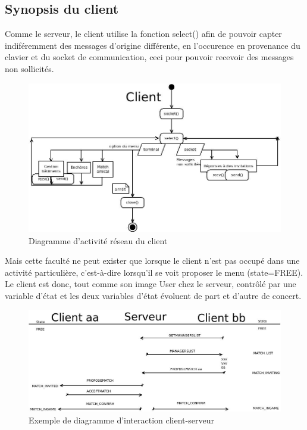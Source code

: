 \documentclass[a4paper,titlepage]{scrreprt}
\begin{document}
\subsection{Synopsis du client}
Comme le serveur, le client utilise la fonction select() afin de pouvoir capter indiféremment des messages d'origine différente,
 en l'occurence en provenance du clavier et du socket de communication, ceci pour pouvoir recevoir des messages non sollicités.
      \begin{figure}[H]
    \center
    \includegraphics[scale=0.4]{uml/Client.jpeg}
    \caption{Diagramme d'activité réseau du client} \label{diag-client}
    \end{figure}
 Mais cette faculté ne peut exister que lorsque le client
 n'est pas occupé dans une activité particulière, c'est-à-dire lorsqu'il se voit proposer le menu (state=FREE).\\
 Le client est donc, tout comme son image User chez le serveur, contrôlé par une variable d'état et les deux variables d'état
 évoluent de part et d'autre de concert.\\
      \begin{figure}[H]
    \center
    \includegraphics[scale=0.4]{uml/PROPOSEMATCH.jpeg}
    \caption{Exemple de diagramme d'interaction client-serveur} \label{diag-client-serveur}
    \end{figure}
\end{document}
